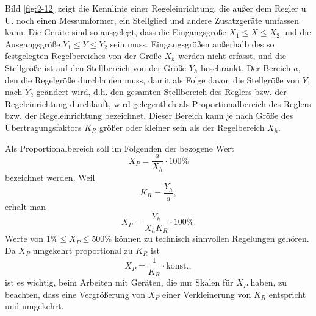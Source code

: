 Bild \ref{fig:2-12} zeigt die Kennlinie einer Regeleinrichtung, die außer dem Regler u. U. noch einen Messumformer, ein Stellglied und andere Zusatzgeräte umfassen kann.
Die Geräte sind so ausgelegt, dass die Eingangsgröße \(X_1 \le X \le X_2\) und die Ausgangsgröße \(Y_1 \le Y \le Y_2\) sein muss.
Eingangsgrößen außerhalb des so festgelegten Regelbereiches von der Größe \(X_h\) werden nicht erfasst, und die Stellgröße ist auf den Stellbereich von der Größe \(Y_h\) beschränkt.
Der Bereich \(a\), den die Regelgröße durchlaufen muss, damit als Folge davon die Stellgröße von \(Y_1\) nach \(Y_2\) geändert wird, d.h. den gesamten Stellbereich des Reglers bzw. der Regeleinrichtung durchläuft, wird gelegentlich als Proportionalbereich des Reglers bzw. der Regeleinrichtung bezeichnet.
Dieser Bereich kann je nach Größe des Übertragungsfaktors \(K_R\) größer oder kleiner sein als der Regelbereich \(X_h\).

Als Proportionalbereich soll im Folgenden der bezogene Wert
\begin{equation}
    X_P = \frac{a}{X_h} \cdot 100\%
\end{equation}
bezeichnet werden.
Weil
\begin{equation}
    K_R = \frac{Y_h}{a},
\end{equation}
erhält man
\begin{equation}
    X_P = \frac{Y_h}{X_h K_R} \cdot 100\%.
\end{equation}
Werte von \(1\% \le X_P \le 500\%\) können zu technisch sinnvollen Regelungen gehören.
Da \(X_P\) umgekehrt proportional zu \(K_R\) ist
\begin{equation}
    X_P = \frac{1}{K_R} \cdot \text{konst.},
\end{equation}
ist es wichtig, beim Arbeiten mit Geräten, die nur Skalen für \(X_P\) haben, zu beachten, dass eine Vergrößerung von \(X_P\) einer Verkleinerung von \(K_R\) entspricht und umgekehrt.
